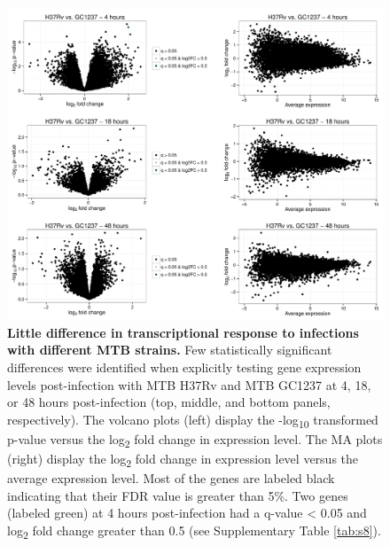 \begin{figure}[htbp]
\centering
\includegraphics[width=5in]{img/ch02/fig-S07-Rv-v-GC.pdf}
\caption[Little difference in transcriptional response to infections
  with different MTB strains.]{\textbf{Little difference in
    transcriptional response to infections with different MTB
    strains.} Few statistically significant differences were
  identified when explicitly testing gene expression levels
  post-infection with MTB H37Rv and MTB GC1237 at 4, 18, or 48 hours
  post-infection (top, middle, and bottom panels, respectively). The
  volcano plots (left) display the -log\textsubscript{10} transformed
  p-value versus the log\textsubscript{2} fold change in expression
  level. The MA plots (right) display the log\textsubscript{2} fold
  change in expression level versus the average expression level. Most
  of the genes are labeled black indicating that their FDR value is
  greater than 5\%. Two genes (labeled green) at 4 hours
  post-infection had a q-value \textless{} 0.05 and
  log\textsubscript{2} fold change greater than 0.5 (see Supplementary
  Table \ref{tab:s8}).}
\label{fig:Rv-v-GC}
\end{figure}

